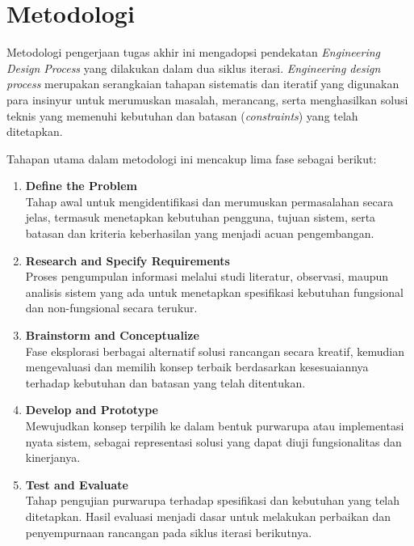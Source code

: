 \section{Metodologi}
Metodologi pengerjaan tugas akhir ini mengadopsi pendekatan \textit{Engineering Design Process} yang dilakukan dalam dua siklus iterasi. \textit{Engineering design process} merupakan serangkaian tahapan sistematis dan iteratif yang digunakan para insinyur untuk merumuskan masalah, merancang, serta menghasilkan solusi teknis yang memenuhi kebutuhan dan batasan (\textit{constraints}) yang telah ditetapkan.

Tahapan utama dalam metodologi ini mencakup lima fase sebagai berikut:
\begin{enumerate}
\item \textbf{Define the Problem}\\Tahap awal untuk mengidentifikasi dan merumuskan permasalahan secara jelas, termasuk menetapkan kebutuhan pengguna, tujuan sistem, serta batasan dan kriteria keberhasilan yang menjadi acuan pengembangan.
\item \textbf{Research and Specify Requirements}\\Proses pengumpulan informasi melalui studi literatur, observasi, maupun analisis sistem yang ada untuk menetapkan spesifikasi kebutuhan fungsional dan non-fungsional secara terukur.
\item \textbf{Brainstorm and Conceptualize}\\Fase eksplorasi berbagai alternatif solusi rancangan secara kreatif, kemudian mengevaluasi dan memilih konsep terbaik berdasarkan kesesuaiannya terhadap kebutuhan dan batasan yang telah ditentukan.
\item \textbf{Develop and Prototype}\\Mewujudkan konsep terpilih ke dalam bentuk purwarupa atau implementasi nyata sistem, sebagai representasi solusi yang dapat diuji fungsionalitas dan kinerjanya.
\item \textbf{Test and Evaluate}\\Tahap pengujian purwarupa terhadap spesifikasi dan kebutuhan yang telah ditetapkan. Hasil evaluasi menjadi dasar untuk melakukan perbaikan dan penyempurnaan rancangan pada siklus iterasi berikutnya.
\end{enumerate}

